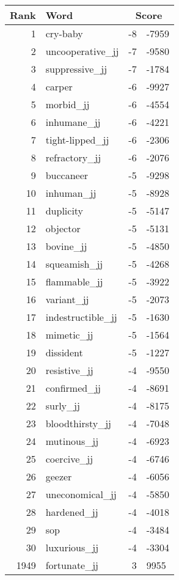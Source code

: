 \begin{longtable}[!htbp]{| rlr@{.}l |}
    \hline
    \textbf{Rank} & \textbf{Word} & \multicolumn{2}{c|}{\textbf{Score}} \\
    \hline
    \endhead
    1 & cry-baby & -8 & -7959 \\
    2 & uncooperative\_jj & -7 & -9580 \\
    3 & suppressive\_jj & -7 & -1784 \\
    4 & carper & -6 & -9927 \\
    5 & morbid\_jj & -6 & -4554 \\
    6 & inhumane\_jj & -6 & -4221 \\
    7 & tight-lipped\_jj & -6 & -2306 \\
    8 & refractory\_jj & -6 & -2076 \\
    9 & buccaneer & -5 & -9298 \\
    10 & inhuman\_jj & -5 & -8928 \\
    11 & duplicity & -5 & -5147 \\
    12 & objector & -5 & -5131 \\
    13 & bovine\_jj & -5 & -4850 \\
    14 & squeamish\_jj & -5 & -4268 \\
    15 & flammable\_jj & -5 & -3922 \\
    16 & variant\_jj & -5 & -2073 \\
    17 & indestructible\_jj & -5 & -1630 \\
    18 & mimetic\_jj & -5 & -1564 \\
    19 & dissident & -5 & -1227 \\
    20 & resistive\_jj & -4 & -9550 \\
    21 & confirmed\_jj & -4 & -8691 \\
    22 & surly\_jj & -4 & -8175 \\
    23 & bloodthirsty\_jj & -4 & -7048 \\
    24 & mutinous\_jj & -4 & -6923 \\
    25 & coercive\_jj & -4 & -6746 \\
    26 & geezer & -4 & -6056 \\
    27 & uneconomical\_jj & -4 & -5850 \\
    28 & hardened\_jj & -4 & -4018 \\
    29 & sop & -4 & -3484 \\
    30 & luxurious\_jj & -4 & -3304 \\
    1949 & fortunate\_jj & 3 & 9955 \\

\end{longtable}
